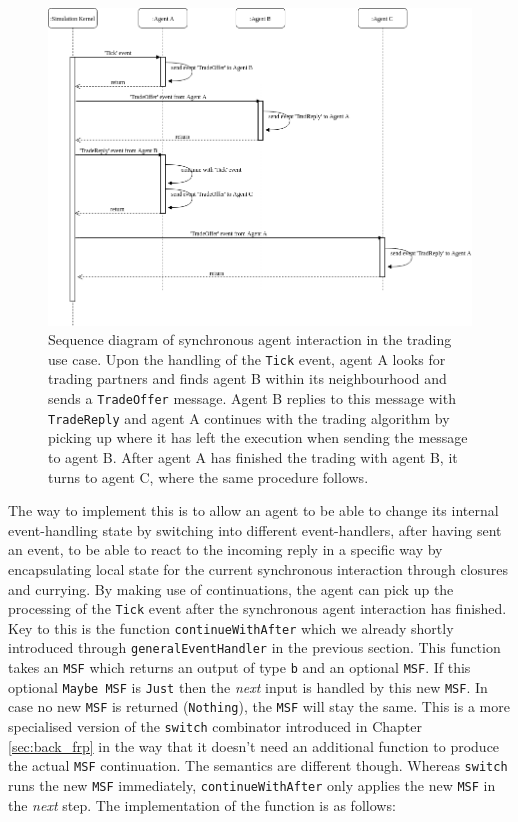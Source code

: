 \begin{figure}
	\centering
	\includegraphics[width=1.0\textwidth, angle=0]{./fig/eventdriven/syncagentinteractions.png}
	\caption[Sequence diagram of synchronous agent interaction in the trading use case]{Sequence diagram of synchronous agent interaction in the trading use case. Upon the handling of the \texttt{Tick} event, agent A looks for trading partners and finds agent B within its neighbourhood and sends a \texttt{TradeOffer} message. Agent B replies to this message with \texttt{TradeReply} and agent A continues with the trading algorithm by picking up where it has left the execution when sending the message to agent B. After agent A has finished the trading with agent B, it turns to agent C, where the same procedure follows.}
	\label{fig:syncagentinteractions}
\end{figure}

The way to implement this is to allow an agent to be able to change its internal event-handling state by switching into different event-handlers, after having sent an event, to be able to react to the incoming reply in a specific way by encapsulating local state for the current synchronous interaction through closures and currying. By making use of continuations, the agent can pick up the processing of the \texttt{Tick} event after the synchronous agent interaction has finished. Key to this is the function \texttt{continueWithAfter} which we already shortly introduced through \texttt{generalEventHandler} in the previous section. This function takes an \texttt{MSF} which returns an output of type \texttt{b} and an optional \texttt{MSF}. If this optional \texttt{Maybe MSF} is \texttt{Just} then the \textit{next} input is handled by this new \texttt{MSF}. In case no new \texttt{MSF} is returned (\texttt{Nothing}), the \texttt{MSF} will stay the same. This is a more specialised version of the \texttt{switch} combinator introduced in Chapter \ref{sec:back_frp} in the way that it doesn't need an additional function to produce the actual \texttt{MSF} continuation. The semantics are different though. Whereas \texttt{switch} runs the new \texttt{MSF} immediately, \texttt{continueWithAfter} only applies the new \texttt{MSF} in the \textit{next} step. The implementation of the function is as follows:

